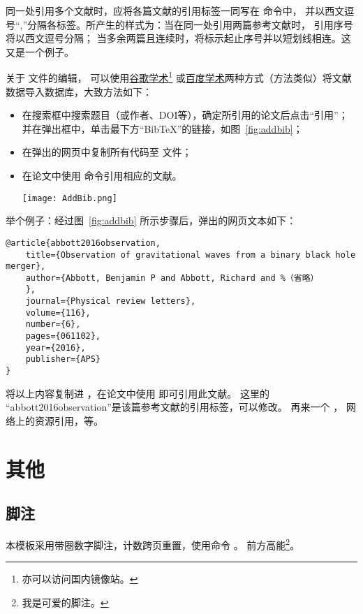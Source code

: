 同一处引用多个文献时，应将各篇文献的引用标签一同写在  命令中，
并以西文逗号“,”分隔各标签。所产生的样式为：当在同一处引用两篇参考文献时，
引用序号将以西文逗号分隔；
当多余两篇且连续时，将标示起止序号并以短划线相连。这\cite{texbook,latexrumen}
又是\cite{texbook,latexrumen,gbt7714-2005}一个例子。\cite{abbott2016observation,texbook,latexrumen,buctthesis}

关于  文件的编辑，
可以使用\href{http://scholar.google.com.cn/}{谷歌学术}\footnote{亦可以访问国内镜像站。}%
或\href{http://xueshu.baidu.com}{百度学术}两种方式（方法类似）将文献数据导入\BibTeX{}数据库，大致方法如下：
\begin{itemize}
	\item 在搜索框中搜索题目（或作者、DOI等），确定所引用的论文后点击“引用”；并在弹出框中，单击最下方“BibTeX”的链接，如图~\ref{fig:addbib}；
	\item 在弹出的网页中复制所有代码至  文件；
	\item 在论文中使用  命令引用相应的文献。
	\begin{table}
		\centering
		\texttt{[image: AddBib.png]}
		\label{fig:addbib}
	\end{table}
\end{itemize}

举个例子：经过图~\ref{fig:addbib} 所示步骤后，弹出的网页文本如下：
\begin{lstlisting}
@article{abbott2016observation,
	title={Observation of gravitational waves from a binary black hole merger},
	author={Abbott, Benjamin P and Abbott, Richard and %（省略）
	},
	journal={Physical review letters},
	volume={116},
	number={6},
	pages={061102},
	year={2016},
	publisher={APS}
}
	\end{lstlisting}
将以上内容复制进 ，在论文中使用
即可引用此文献。
这里的 “abbott2016observation”是该篇参考文献的引用标签，可以修改。
再来一个\cite{ashirov2008tetramerization} ，
网络上的资源引用\cite{buctthesis}，等。

\section{其他}\label{sec:other}

\subsection{脚注}\label{subsec:footnote}
本模板采用带圈数字脚注，计数跨页重置，使用命令 。
前方高能\footnote{我是可爱的脚注。}。

